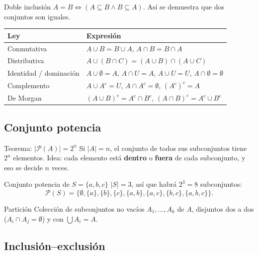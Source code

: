 \begin{tmdef}{Doble inclusi\'on}
$A=B\iff(A\subseteq B\wedge B\subseteq A)$. As\'i se demuestra que dos conjuntos son iguales.
\end{tmdef}

\begin{center}
\begin{tabular}{|p{3.6cm}|p{9cm}|}
\hline
\rowcolor{tmAzulClaro}\textbf{Ley} & \textbf{Expresi\'on}\\ \hline
Conmutativa & $A\cup B=B\cup A$, $A\cap B=B\cap A$\\ \hline
Distributiva & $A\cup(B\cap C)=(A\cup B)\cap(A\cup C)$\\ \hline
Identidad / dominaci\'on & $A\cup\emptyset=A$, $A\cap U=A$, $A\cup U=U$, $A\cap\emptyset=\emptyset$\\ \hline
Complemento & $A\cup A^c=U$, $A\cap A^c=\emptyset$, $(A^c)^c=A$\\ \hline
De Morgan & $(A\cup B)^c=A^c\cap B^c$, $(A\cap B)^c=A^c\cup B^c$\\ \hline
\end{tabular}
\end{center}

\subsection{Conjunto potencia}
\begin{tmdef}{Teorema: $|\mathcal P(A)|=2^n$}
Si $|A|=n$, el conjunto de todos sus subconjuntos tiene $2^n$ elementos. Idea: cada elemento est\'a \textbf{dentro} o \textbf{fuera} de cada subconjunto, y eso se decide $n$ veces.
\end{tmdef}

\begin{tmejemplo}{Conjunto potencia de $S=\{a, b, c\}$}
$|S|=3$, as\'i que habr\'a $2^3=8$ subconjuntos:
\[\mathcal P(S)=\{\emptyset,\{a\},\{b\},\{c\},\{a, b\},\{a, c\},\{b, c\},\{a, b, c\}\}.\]
\end{tmejemplo}

\begin{tmdef}{Partici\'on}
Colecci\'on de subconjuntos no vac\'ios $A_1,\dots,A_k$ de $A$, disjuntos dos a dos ($A_i\cap A_j=\emptyset$) y con $\bigcup A_i=A$.
\end{tmdef}

\subsection{Inclusi\'on--exclusi\'on}

